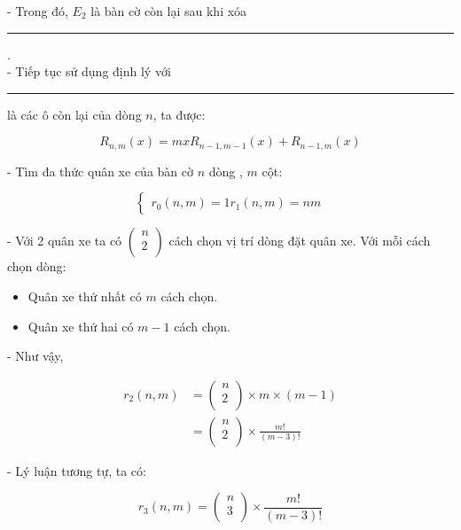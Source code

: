 \documentclass[12pt]{article}
\newcommand\crule[3][black]{\textcolor{#1}{\rule{#2}{#3}}}
\begin{document}
\begin{sloppypar}
- Trong đó, \(E_{2}\) là bàn cờ còn lại sau khi xóa \crule[cyan]{0.3cm}{0.3cm}. \\
- Tiếp tục sử dụng định lý với \crule[cyan]{0.3cm}{0.3cm} là các ô còn lại của dòng \(n\), ta được:

\begin{equation*}
    R_{n,m}(x) = mxR_{n-1,m-1}(x) + R_{n-1,m}(x)
\end{equation*}

- Tìm đa thức quân xe của bàn cờ \(n\) dòng , \(m\) cột:

\[
    \begin{cases}
        r_{0}(n,m) = 1
        r_{1}(n,m) = nm
    \end{cases}
    \]

- Với 2 quân xe ta có \( \begin{pmatrix} n \\ 2 \\ \end{pmatrix} \) cách chọn vị trí dòng đặt quân xe. Với mỗi cách chọn dòng:

\begin{itemize}
    \item Quân xe thứ nhất có \(m\) cách chọn.
    \item Quân xe thứ hai có \(m-1\) cách chọn.
\end{itemize}

- Như vậy,

\begin{align*}
    r_{2}(n,m)  & = \begin{pmatrix} n \\ 2 \\ \end{pmatrix} \times  m \times (m-1) \\
                & = \begin{pmatrix} n \\ 2 \\ \end{pmatrix} \times  \frac{m!}{(m-3)!}
\end{align*}

- Lý luận tương tự, ta có:

\begin{equation*}
    r_{3}(n,m) = \begin{pmatrix} n \\ 3 \\ \end{pmatrix} \times \frac{m!}{(m-3)!}
\end{equation*}


\end{sloppypar}
\end{document}
